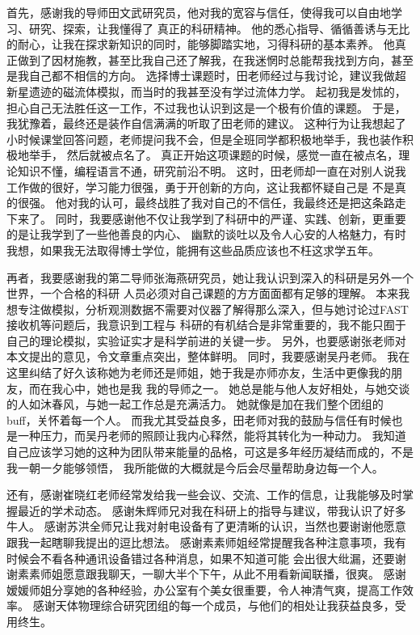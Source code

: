 首先，感谢我的导师田文武研究员，他对我的宽容与信任，使得我可以自由地学习、研究、探索，让我懂得了
真正的科研精神。
他的悉心指导、循循善诱与无比的耐心，让我在探求新知识的同时，能够脚踏实地，习得科研的基本素养。
他真正做到了因材施教，甚至比我自己还了解我，在我迷惘时总能帮我找到方向，甚至是我自己都不相信的方向。
选择博士课题时，田老师经过与我讨论，建议我做超新星遗迹的磁流体模拟，而当时的我甚至没有学过流体力学。
起初我是发怵的，担心自己无法胜任这一工作，不过我也认识到这是一个极有价值的课题。
于是，我犹豫着，最终还是装作自信满满的听取了田老师的建议。
这种行为让我想起了小时候课堂回答问题，老师提问我不会，但是全班同学都积极地举手，我也装作积极地举手，
然后就被点名了。
真正开始这项课题的时候，感觉一直在被点名，理论知识不懂，编程语言不通，研究前沿不明。
这时，田老师却一直在对别人说我工作做的很好，学习能力很强，勇于开创新的方向，这让我都怀疑自己是
不是真的很强。
他对我的认可，最终战胜了我对自己的不信任，我最终还是把这条路走下来了。
同时，我要感谢他不仅让我学到了科研中的严谨、实践、创新，更重要的是让我学到了一些他善良的内心、
幽默的谈吐以及令人心安的人格魅力，有时我想，如果我无法取得博士学位，能拥有这些品质应该也不枉这求学五年。

再者，我要感谢我的第二导师张海燕研究员，她让我认识到深入的科研是另外一个世界，一个合格的科研
人员必须对自己课题的方方面面都有足够的理解。
本来我想专注做模拟，分析观测数据不需要对仪器了解得那么深入，但与她讨论过FAST接收机等问题后，我意识到工程与
科研的有机结合是非常重要的，我不能只囿于自己的理论模拟，实验证实才是科学前进的关键一步。
另外，也要感谢张老师对本文提出的意见，令文章重点突出，整体鲜明。
同时，我要感谢吴丹老师。
我在这里纠结了好久该称她为老师还是师姐，她于我是亦师亦友，生活中更像我的朋友，而在我心中，她也是我
我的导师之一。
她总是能与他人友好相处，与她交谈的人如沐春风，与她一起工作总是充满活力。
她就像是加在我们整个团组的buff，关怀着每一个人。
而我尤其受益良多，田老师对我的鼓励与信任有时候也是一种压力，而吴丹老师的照顾让我内心释然，能将其转化为一种动力。
我知道自己应该学习她的这种为团队带来能量的品格，可这是多年经历凝结而成的，不是我一朝一夕能够领悟，
我所能做的大概就是今后会尽量帮助身边每一个人。

还有，感谢崔晓红老师经常发给我一些会议、交流、工作的信息，让我能够及时掌握最近的学术动态。
感谢朱辉师兄对我在科研上的指导与建议，带我认识了好多牛人。
感谢苏洪全师兄让我对射电设备有了更清晰的认识，当然也要谢谢他愿意跟我一起瞎聊我提出的逗比想法。
感谢素素师姐经常提醒我各种注意事项，我有时候会不看各种通讯设备错过各种消息，如果不知道可能
会出很大纰漏，还要谢谢素素师姐愿意跟我聊天，一聊大半个下午，从此不用看新闻联播，很爽。
感谢嫒媛师姐分享她的各种经验，办公室有个美女很重要，令人神清气爽，提高工作效率。
感谢天体物理综合研究团组的每一个成员，与他们的相处让我获益良多，受用终生。

